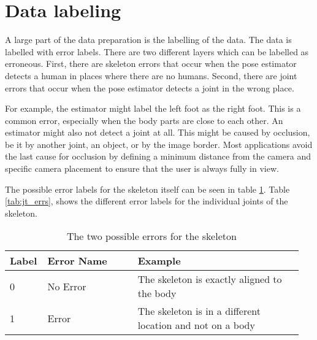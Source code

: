 \section{Data labeling}
\label{sec:data_labeling}

A large part of the data preparation is the labelling of the data. The data is labelled with error labels. There are two different layers which can be labelled as erroneous. First, there are skeleton errors that occur when the pose estimator detects a human in places where there are no humans. Second, there are joint errors that occur when the pose estimator detects a joint in the wrong place. 

For example, the estimator might label the left foot as the right foot. This is a common error, especially when the body parts are close to each other. An estimator might also not detect a joint at all. This might be caused by occlusion, be it by another joint, an object, or by the image border. Most applications avoid the last cause for occlusion by defining a minimum distance from the camera and specific camera placement to ensure that the user is always fully in view.

The possible error labels for the skeleton itself can be seen in table \ref{tab:skel_errs}. Table \ref{tab:jt_errs}, shows the different error labels for the individual joints of the skeleton.

\begin{table}[htb]
  \centering
  \caption{The two possible errors for the skeleton}
  \label{tab:skel_errs}
  \begin{tabular}{p{0.1\linewidth}p{0.3\linewidth}p{0.55\linewidth}}
  \hline
  \textbf{Label} & \textbf{Error Name} & \textbf{Example} \\ \hline
  0                    & No Error            & The skeleton is exactly aligned to the body               \\
  1                    & Error               & The skeleton is in a different location and not on a body \\ \hline
  \end{tabular} 
\end{table}

